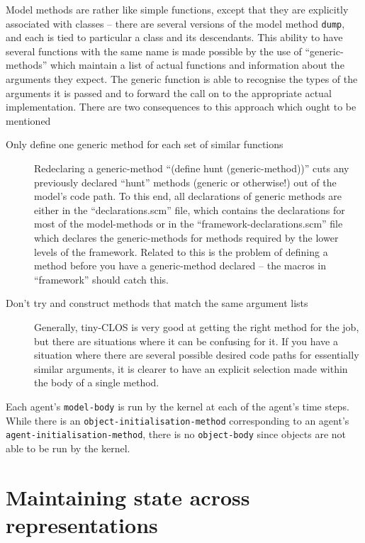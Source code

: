 Model methods are rather like simple functions, except that they are
explicitly associated with classes -- there are several versions of
the model method \texttt{dump}, and each is tied to particular a class
and its descendants.  This ability to have several functions with the same
name is made possible by the use of ``generic-methods'' which
maintain a list of actual functions and information about the
arguments they expect.  The generic function is able to 
recognise the types of the arguments it is passed and to forward the
call on to the appropriate actual implementation.  There are two
consequences to this approach which ought to be mentioned
\begin{description}
  \item[Only define one generic method for each set of similar
    functions] Redeclaring a generic-method ``(define hunt
    (generic-method))'' cuts any previously declared ``hunt'' methods
    (generic or otherwise!) out of the model's code path. To this end,
    all declarations of generic methods are either in the
    ``declarations.scm'' file, which contains the declarations for
    most of the model-methods or in the ``framework-declarations.scm''
    file which declares the generic-methods for methods required by
    the lower levels of the framework.  Related to this is the problem
    of defining a method before you have a generic-method declared --
    the macros in ``framework'' should catch this.
  \item[Don't try and construct methods that match the same argument
    lists] Generally, tiny-CLOS is very good at getting the right
    method for the job, but there are situations where it can be
    confusing for it.  If you have a situation where there are several
    possible desired code paths for essentially similar arguments, it
    is clearer to have an explicit selection made within the body of a
    single method.
\end{description}
 
Each agent's \texttt{model-body} is run by the kernel at each of the
agent's time steps. While there is an
\texttt{object-initialisation-method} corresponding to an agent's
\texttt{agent-initialisation-method}, there is no \texttt{object-body}
since objects are not able to be run by the kernel.

\section{Maintaining state across representations}

